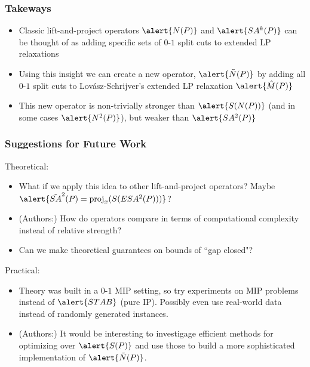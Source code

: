 \documentclass{beamer}
\DeclareMathOperator{\proj}{proj}
\begin{document}
\begin{frame}
\frametitle{Takeways}
\begin{itemize}
\item Classic lift-and-project operators $\alert{N(P)}$ and $\alert{SA^k(P)}$ can be thought of as adding specific sets of $0$-$1$ split cuts to extended LP relaxations
\item Using this insight we can create a new operator, $\alert{\tilde{N}(P)}$ by adding all $0$-$1$ split cuts to Lov\'asz-Schrijver's extended LP relaxation $\alert{\hat{M}(P)}$
\item This new operator is non-trivially stronger than $\alert{S(N(P))}$ (and in some cases $\alert{N^2(P)}$), but weaker than $\alert{SA^2(P)}$
\end{itemize}
\end{frame}

\begin{frame}
\frametitle{Suggestions for Future Work}
Theoretical:
\begin{itemize}
\item What if we apply this idea to other lift-and-project operators? Maybe $\alert{\tilde{SA}^2(P) = \proj_x (S(ESA^2(P)))}$?
\item (Authors:) How do operators compare in terms of computational complexity instead of relative strength?
\item Can we make theoretical guarantees on bounds of ``gap closed"?
\end{itemize}
Practical:
\begin{itemize}
\item Theory was built in a $0$-$1$ MIP setting, so try experiments on MIP problems instead of $\alert{STAB}$ (pure IP). Possibly even use real-world data instead of randomly generated instances.
\item (Authors:) It would be interesting to investigage efficient methods for optimizing over $\alert{S(P)}$ and use those to build a more sophisticated implementation of $\alert{\tilde{N}(P)}$.
\end{itemize}
\end{frame}
\end{document}
